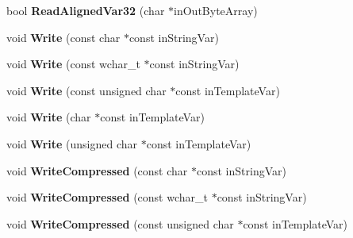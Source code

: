 \begin{DoxyCompactItemize}
\item 
\hypertarget{class_rak_net_1_1_bit_stream_afa6e6c88c3f37e315312605184637c03}{bool {\bfseries Read\-Aligned\-Var32} (char $\ast$in\-Out\-Byte\-Array)}\label{class_rak_net_1_1_bit_stream_afa6e6c88c3f37e315312605184637c03}

\item 
\hypertarget{class_rak_net_1_1_bit_stream_a0932983f126737e00efca6c1247462a4}{void {\bfseries Write} (const char $\ast$const in\-String\-Var)}\label{class_rak_net_1_1_bit_stream_a0932983f126737e00efca6c1247462a4}

\item 
\hypertarget{class_rak_net_1_1_bit_stream_acf60a64055ee62dacb5538cdbadb0f29}{void {\bfseries Write} (const wchar\-\_\-t $\ast$const in\-String\-Var)}\label{class_rak_net_1_1_bit_stream_acf60a64055ee62dacb5538cdbadb0f29}

\item 
\hypertarget{class_rak_net_1_1_bit_stream_a8c81a19b752fe557b7531618407f6c60}{void {\bfseries Write} (const unsigned char $\ast$const in\-Template\-Var)}\label{class_rak_net_1_1_bit_stream_a8c81a19b752fe557b7531618407f6c60}

\item 
\hypertarget{class_rak_net_1_1_bit_stream_aee13edf8d20d66989fce1fb1539d994d}{void {\bfseries Write} (char $\ast$const in\-Template\-Var)}\label{class_rak_net_1_1_bit_stream_aee13edf8d20d66989fce1fb1539d994d}

\item 
\hypertarget{class_rak_net_1_1_bit_stream_afbe5fc243767cdf959e21ac8af7b449a}{void {\bfseries Write} (unsigned char $\ast$const in\-Template\-Var)}\label{class_rak_net_1_1_bit_stream_afbe5fc243767cdf959e21ac8af7b449a}

\item 
\hypertarget{class_rak_net_1_1_bit_stream_ae090440bc651b40ee0b1f849335367fb}{void {\bfseries Write\-Compressed} (const char $\ast$const in\-String\-Var)}\label{class_rak_net_1_1_bit_stream_ae090440bc651b40ee0b1f849335367fb}

\item 
\hypertarget{class_rak_net_1_1_bit_stream_ad0569da44fb87240fd93966dd1891008}{void {\bfseries Write\-Compressed} (const wchar\-\_\-t $\ast$const in\-String\-Var)}\label{class_rak_net_1_1_bit_stream_ad0569da44fb87240fd93966dd1891008}

\item 
\hypertarget{class_rak_net_1_1_bit_stream_a1f5a9b8d0a87833f3a346e8a70b346fd}{void {\bfseries Write\-Compressed} (const unsigned char $\ast$const in\-Template\-Var)}\label{class_rak_net_1_1_bit_stream_a1f5a9b8d0a87833f3a346e8a70b346fd}


\end{DoxyCompactItemize}
